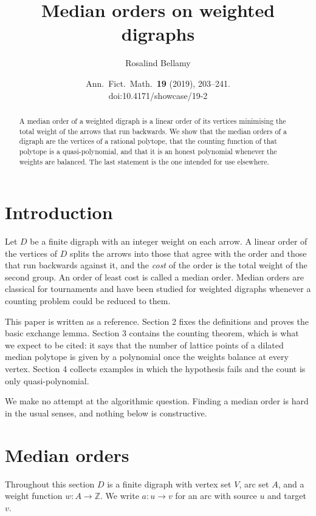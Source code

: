 \documentclass[11pt]{article}
\title{Median orders on weighted digraphs}
\author{Rosalind Bellamy}
\date{Ann.\ Fict.\ Math.\ \textbf{19} (2019), 203--241. \\ doi:10.4171/showcase/19-2}
\theoremstyle{plain}
\theoremstyle{definition}
\newcommand{\ZZ}{\mathbb{Z}}
\begin{document}
\maketitle

\begin{abstract}
A median order of a weighted digraph is a linear order of its vertices minimising the total weight of the arrows that run backwards. We show that the median orders of a digraph are the vertices of a rational polytope, that the counting function of that polytope is a quasi-polynomial, and that it is an honest polynomial whenever the weights are balanced. The last statement is the one intended for use elsewhere.
\end{abstract}

\section{Introduction}

Let $D$ be a finite digraph with an integer weight on each arrow. A linear order of the vertices of $D$ splits the arrows into those that agree with the order and those that run backwards against it, and the \emph{cost} of the order is the total weight of the second group. An order of least cost is called a median order. Median orders are classical for tournaments and have been studied for weighted digraphs whenever a counting problem could be reduced to them.

This paper is written as a reference. Section 2 fixes the definitions and proves the basic exchange lemma. Section 3 contains the counting theorem, which is what we expect to be cited: it says that the number of lattice points of a dilated median polytope is given by a polynomial once the weights balance at every vertex. Section 4 collects examples in which the hypothesis fails and the count is only quasi-polynomial.

We make no attempt at the algorithmic question. Finding a median order is hard in the usual senses, and nothing below is constructive.

\section{Median orders}

Throughout this section $D$ is a finite digraph with vertex set $V$, arc set $A$, and a weight function $w \colon A \to \ZZ$. We write $a \colon u \to v$ for an arc with source $u$ and target $v$.
\end{document}
